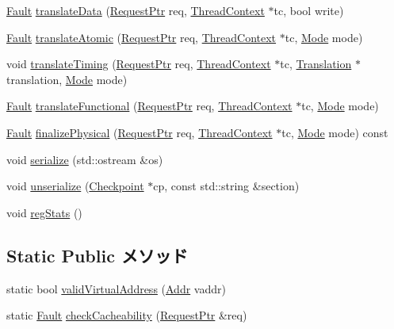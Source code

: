 \begin{DoxyCompactItemize}
\item 
\hyperlink{classRefCountingPtr}{Fault} \hyperlink{classPowerISA_1_1TLB_ad54aef66412f77e2a15a621a126dfb52}{translateData} (\hyperlink{classRequest}{RequestPtr} req, \hyperlink{classThreadContext}{ThreadContext} $\ast$tc, bool write)
\item 
\hyperlink{classRefCountingPtr}{Fault} \hyperlink{classPowerISA_1_1TLB_ad54e01e3c0a1613098a76b7f92e5be93}{translateAtomic} (\hyperlink{classRequest}{RequestPtr} req, \hyperlink{classThreadContext}{ThreadContext} $\ast$tc, \hyperlink{classBaseTLB_a46c8a310cf4c094f8c80e1cb8dc1f911}{Mode} mode)
\item 
void \hyperlink{classPowerISA_1_1TLB_ae52f7e465748883695d2b4f432a13652}{translateTiming} (\hyperlink{classRequest}{RequestPtr} req, \hyperlink{classThreadContext}{ThreadContext} $\ast$tc, \hyperlink{classBaseTLB_1_1Translation}{Translation} $\ast$translation, \hyperlink{classBaseTLB_a46c8a310cf4c094f8c80e1cb8dc1f911}{Mode} mode)
\item 
\hyperlink{classRefCountingPtr}{Fault} \hyperlink{classPowerISA_1_1TLB_a26658814c6c9034665aae19cf25545bb}{translateFunctional} (\hyperlink{classRequest}{RequestPtr} req, \hyperlink{classThreadContext}{ThreadContext} $\ast$tc, \hyperlink{classBaseTLB_a46c8a310cf4c094f8c80e1cb8dc1f911}{Mode} mode)
\item 
\hyperlink{classRefCountingPtr}{Fault} \hyperlink{classPowerISA_1_1TLB_ae199d95c42e036851a8a0543c6d6d2e3}{finalizePhysical} (\hyperlink{classRequest}{RequestPtr} req, \hyperlink{classThreadContext}{ThreadContext} $\ast$tc, \hyperlink{classBaseTLB_a46c8a310cf4c094f8c80e1cb8dc1f911}{Mode} mode) const 
\item 
void \hyperlink{classPowerISA_1_1TLB_a53e036786d17361be4c7320d39c99b84}{serialize} (std::ostream \&os)
\item 
void \hyperlink{classPowerISA_1_1TLB_af22e5d6d660b97db37003ac61ac4ee49}{unserialize} (\hyperlink{classCheckpoint}{Checkpoint} $\ast$cp, const std::string \&section)
\item 
void \hyperlink{classPowerISA_1_1TLB_a4dc637449366fcdfc4e764cdf12d9b11}{regStats} ()
\end{DoxyCompactItemize}
\subsection*{Static Public メソッド}
\begin{DoxyCompactItemize}
\item 
static bool \hyperlink{classPowerISA_1_1TLB_a3e576c3e0d39dfca708baea44ebf0617}{validVirtualAddress} (\hyperlink{base_2types_8hh_af1bb03d6a4ee096394a6749f0a169232}{Addr} vaddr)
\item 
static \hyperlink{classRefCountingPtr}{Fault} \hyperlink{classPowerISA_1_1TLB_a40ebca6d00905ad6f0ea93be1621a1bd}{checkCacheability} (\hyperlink{classRequest}{RequestPtr} \&req)
\end{DoxyCompactItemize}
